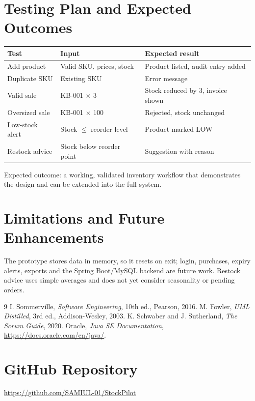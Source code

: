 \documentclass[11pt,a4paper]{article}
\begin{document}

\section{Testing Plan and Expected Outcomes}
\begin{table}[H]\centering\small\begin{tabular}{lp{5.5cm}p{4.5cm}}\toprule
\textbf{Test} & \textbf{Input} & \textbf{Expected result}\\\midrule
Add product & Valid SKU, prices, stock & Product listed, audit entry added\\
Duplicate SKU & Existing SKU & Error message\\
Valid sale & KB-001 $\times$ 3 & Stock reduced by 3, invoice shown\\
Oversized sale & KB-001 $\times$ 100 & Rejected, stock unchanged\\
Low-stock alert & Stock $\le$ reorder level & Product marked LOW\\
Restock advice & Stock below reorder point & Suggestion with reason\\\bottomrule
\end{tabular}\end{table}
Expected outcome: a working, validated inventory workflow that demonstrates the design and can be extended into the full system.

\section{Limitations and Future Enhancements}
The prototype stores data in memory, so it resets on exit; login, purchases, expiry alerts, exports and the Spring Boot/MySQL backend are future work. Restock advice uses simple averages and does not yet consider seasonality or pending orders.

\begin{thebibliography}{9}
 I. Sommerville, \emph{Software Engineering}, 10th ed., Pearson, 2016.
 M. Fowler, \emph{UML Distilled}, 3rd ed., Addison-Wesley, 2003.
 K. Schwaber and J. Sutherland, \emph{The Scrum Guide}, 2020.
 Oracle, \emph{Java SE Documentation}, \url{https://docs.oracle.com/en/java/}.
\end{thebibliography}

\section*{GitHub Repository}
\url{https://github.com/SAMIUL-01/StockPilot}
\end{document}
